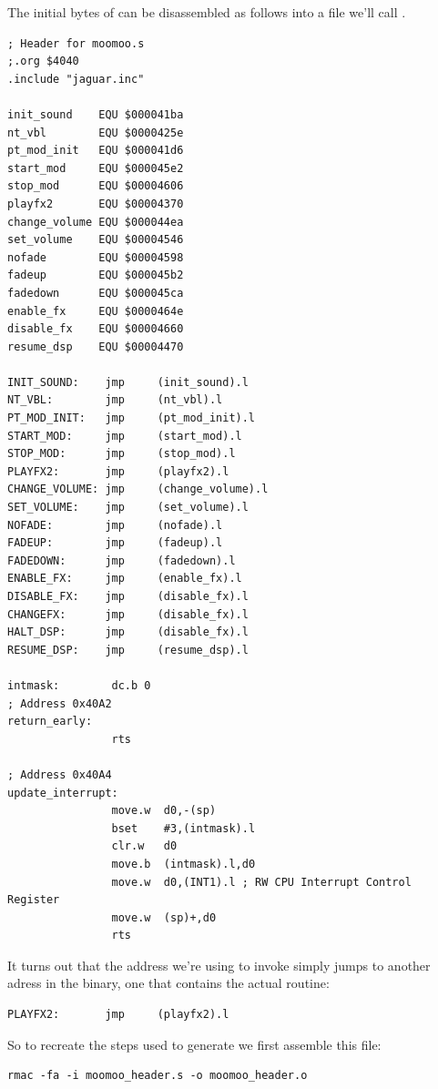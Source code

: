 The initial bytes of  can be disassembled as follows into a file we'll call . 
\begin{lstlisting}[caption=The contents of \icode{moomoo\_header.s}.]
; Header for moomoo.s
;.org $4040
.include "jaguar.inc"

init_sound    EQU $000041ba
nt_vbl        EQU $0000425e
pt_mod_init   EQU $000041d6
start_mod     EQU $000045e2
stop_mod      EQU $00004606
playfx2       EQU $00004370
change_volume EQU $000044ea
set_volume    EQU $00004546
nofade        EQU $00004598
fadeup        EQU $000045b2
fadedown      EQU $000045ca
enable_fx     EQU $0000464e
disable_fx    EQU $00004660
resume_dsp    EQU $00004470

INIT_SOUND:    jmp     (init_sound).l
NT_VBL:        jmp     (nt_vbl).l
PT_MOD_INIT:   jmp     (pt_mod_init).l
START_MOD:     jmp     (start_mod).l
STOP_MOD:      jmp     (stop_mod).l
PLAYFX2:       jmp     (playfx2).l
CHANGE_VOLUME: jmp     (change_volume).l
SET_VOLUME:    jmp     (set_volume).l
NOFADE:        jmp     (nofade).l
FADEUP:        jmp     (fadeup).l
FADEDOWN:      jmp     (fadedown).l
ENABLE_FX:     jmp     (enable_fx).l
DISABLE_FX:    jmp     (disable_fx).l
CHANGEFX:      jmp     (disable_fx).l
HALT_DSP:      jmp     (disable_fx).l
RESUME_DSP:    jmp     (resume_dsp).l

intmask:        dc.b 0
; Address 0x40A2
return_early:
                rts

; Address 0x40A4
update_interrupt:
                move.w  d0,-(sp)
                bset    #3,(intmask).l
                clr.w   d0
                move.b  (intmask).l,d0
                move.w  d0,(INT1).l ; RW CPU Interrupt Control Register
                move.w  (sp)+,d0
                rts
\end{lstlisting}

It turns out that the address we're using to invoke  simply jumps to another adress in the binary,
one that contains the actual  routine:

\begin{lstlisting}
PLAYFX2:       jmp     (playfx2).l
\end{lstlisting}

So to recreate the steps used to generate  we first assemble this file:

\begin{lstlisting}
rmac -fa -i moomoo_header.s -o moomoo_header.o
\end{lstlisting}

